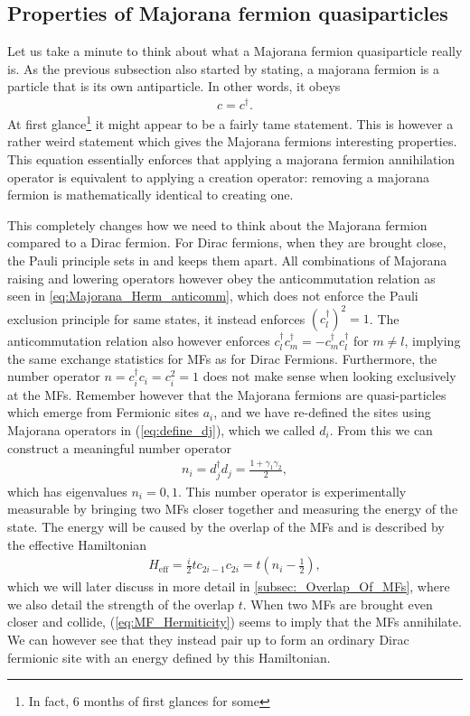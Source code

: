 \subsection{Properties of Majorana fermion quasiparticles}
Let us take a minute to think about what a Majorana fermion quasiparticle really is. As the previous subsection also started by stating, a majorana fermion is a particle that is its own antiparticle. In other words, it obeys
\begin{align}
    c = c^\dagger. \label{eq:MF_Hermiticity}
\end{align}
At first glance\footnote{In fact, 6 months of first glances for some} it might appear to be a fairly tame statement. This is however a rather weird statement which gives the Majorana fermions interesting properties. This equation essentially enforces that applying a majorana fermion annihilation operator is equivalent to applying a creation operator: removing a majorana fermion is mathematically identical to creating one. 

This completely changes how we need to think about the Majorana fermion compared to a Dirac fermion. For Dirac fermions, when they are brought close, the Pauli principle sets in and keeps them apart. All combinations of Majorana raising and lowering operators however obey the anticommutation relation as seen in \ref{eq:Majorana_Herm_anticomm}, which does not enforce the Pauli exclusion principle for same states, it instead enforces $(c_l^\dagger)^2 = 1$. The anticommutation relation also however enforces $c_l^\dagger c_m^\dagger = - c_m^\dagger c_l^\dagger$ for $m \neq l$, implying the same exchange statistics for MFs as for Dirac Fermions. Furthermore, the number operator $n = c^\dagger_i c_i = c^2_i = 1$ does not make sense when looking exclusively at the MFs. Remember however that the Majorana fermions are quasi-particles which emerge from Fermionic sites $a_i$, and we have re-defined the sites using Majorana operators in (\ref{eq:define_dj}), which we called $d_i$. From this we can construct a meaningful number operator
\begin{align}
    n_i = d_j^\dagger d_j = \frac{1 + \gamma_1 \gamma_2}{2},
\end{align}
which has eigenvalues $n_i = 0, 1$. This number operator is experimentally measurable by bringing two MFs closer together and measuring the energy of the state. The energy will be caused by the overlap of the MFs and is described by the effective Hamiltonian
\begin{align}
    H_\text{eff} = \frac{i}{2}t c_{2i-1} c_{2i} = t \left(n_i - \frac{1}{2} \right),
\end{align}
which we will later discuss in more detail in \ref{subsec:_Overlap_Of_MFs}, where we also detail the strength of the overlap $t$. When two MFs are brought even closer and collide, (\ref{eq:MF_Hermiticity}) seems to imply that the MFs annihilate. We can however see that they instead pair up to form an ordinary Dirac fermionic site with an energy defined by this Hamiltonian.

